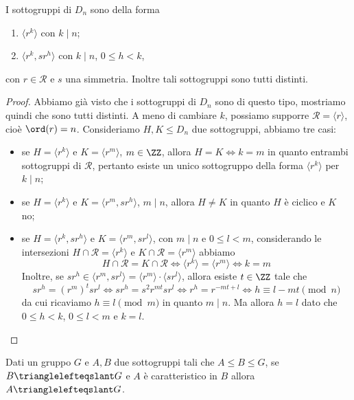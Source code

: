 \documentclass[11pt]{scrartcl}
\begin{document}
\begin{theorem}
I sottogruppi di $D_n$ sono della forma \begin{enumerate}[(1)]
    \item $\langle r^k\rangle$ con $k\mid n$;
    \item $\langle r^k, sr^h\rangle$ con $k \mid n$, $0\leq h < k$, 
\end{enumerate}
con $r \in \mathcal{R}$ e $s$ una simmetria. Inoltre tali sottogruppi sono
tutti distinti.
\end{theorem}

\begin{proof}
    Abbiamo già visto che i sottogruppi di $D_n$ sono di questo tipo, 
    mostriamo quindi che sono tutti distinti. A meno di cambiare $k$, possiamo
    supporre $\mathcal{R} = \langle r\rangle$, cioè $\ord(r) = n$. 
    Consideriamo $H, K\leqslant D_n$ due sottogruppi, abbiamo tre casi:
    \begin{itemize}
        \item se $H = \langle r^k\rangle$ e $K = \langle r^m\rangle$, $m \in \ZZ$,
        allora $H = K\iff k = m$ in quanto entrambi sottogruppi di $\mathcal{R}$, 
        pertanto esiste un unico sottogruppo della forma $\langle r^k\rangle$
        per $k \mid n$;
        \item se $H = \langle r^k\rangle$ e $K = \langle r^m, sr^h\rangle$, $m \mid n$,
        allora $H \neq K$ in quanto $H$ è ciclico e $K$ no;
        \item se $H = \langle r^k, sr^h\rangle$ e $K = \langle r^m, sr^l\rangle$, 
        con $m \mid n$ e $0\leq l < m$, considerando le intersezioni
        $H \cap \mathcal{R} = \langle r^k\rangle$ e $K \cap \mathcal{R} = \langle r^m\rangle$ 
        abbiamo \[
        H \cap \mathcal{R} = K\cap\mathcal{R} \iff \langle r^k\rangle = \langle r^m\rangle
        \iff k = m
        \] Inoltre, se $sr^h \in \langle r^m, sr^l\rangle = \langle r^m\rangle
        \cdot \langle sr^l\rangle$, allora esiste $t \in \ZZ$ tale che \[
        sr^h = (r^m)^t sr^l \iff sr^h = s^2r^{mt}sr^l \iff r^h = r^{-mt + l}
        \iff h \equiv l - mt \pmod n
        \]da cui ricaviamo $h \equiv l \pmod m$ in quanto $m \mid n$. Ma allora 
        $h =l$ dato che $0 \leq h < k$, $0\leq l < m$ e $k = l$.
    \end{itemize}
\end{proof}

\begin{lemma}
    \label{lemma1.20}
    Dati un gruppo $G$ e $A, B$ due sottogruppi tali che $A \leqslant B \leqslant G$,
    se $B\trianglelefteqslant G$ e $A$ è caratteristico in $B$ allora 
    $A \trianglelefteqslant G$.
\end{lemma}
\end{document}
